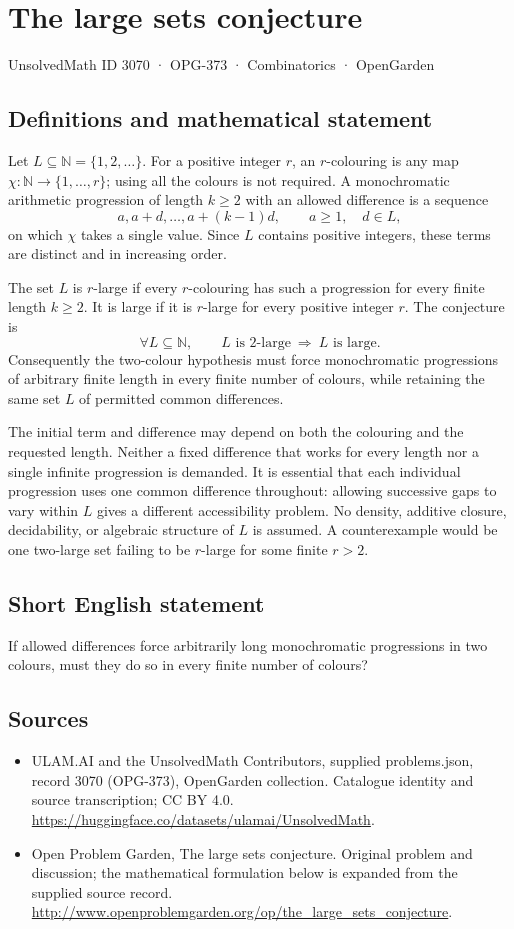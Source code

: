 \documentclass[11pt,a4paper]{article}
\begin{document}
\section*{The large sets conjecture}\label{3070}
{\small UnsolvedMath ID 3070 · OPG-373 · Combinatorics · OpenGarden}
\subsection{Definitions and mathematical statement}
Let $L\subseteq\mathbb N=\{1,2,\ldots\}$. For a positive integer $r$,
an $r$-colouring is any map $\chi:\mathbb N\to\{1,\ldots,r\}$; using
all the colours is not required. A monochromatic arithmetic progression
of length $k\ge2$ with an allowed difference is a sequence
\[
 a,a+d,\ldots,a+(k-1)d,\qquad a\ge1,\quad d\in L,
\]
on which $\chi$ takes a single value. Since $L$ contains positive integers,
these terms are distinct and in increasing order.

The set $L$ is $r$-large if every $r$-colouring has such a progression
for every finite length $k\ge2$. It is large if it is $r$-large for every
positive integer $r$.
The conjecture is
\[
 \forall L\subseteq\mathbb N,\qquad
 L\text{ is }2\text{-large}\ \Longrightarrow\ L\text{ is large}.
\]
Consequently the two-colour hypothesis must force monochromatic
progressions of arbitrary finite length in every finite number of colours,
while retaining the same set $L$ of permitted common differences.

The initial term and difference may depend on both the colouring and the
requested length. Neither a fixed difference that works for every length
nor a single infinite progression is demanded. It is essential that each
individual progression uses one common difference throughout: allowing
successive gaps to vary within $L$ gives a different accessibility problem.
No density, additive closure, decidability, or algebraic structure of $L$
is assumed. A counterexample would be one two-large set failing to be
$r$-large for some finite $r>2$.
\subsection{Short English statement}
If allowed differences force arbitrarily long monochromatic progressions in two colours, must they do so in every finite number of colours?
\subsection{Sources}
\begin{itemize}
\item[S1] ULAM.AI and the UnsolvedMath Contributors, supplied problems.json, record 3070 (OPG-373), OpenGarden collection. Catalogue identity and source transcription; CC BY 4.0.
\url{https://huggingface.co/datasets/ulamai/UnsolvedMath}.
\item[S2] Open Problem Garden, The large sets conjecture. Original problem and discussion; the mathematical formulation below is expanded from the supplied source record.
\url{http://www.openproblemgarden.org/op/the_large_sets_conjecture}.
\end{itemize}
\end{document}
